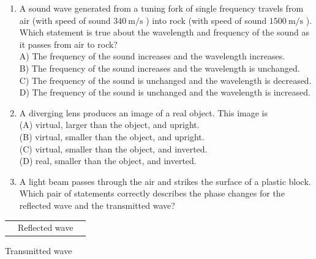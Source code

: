 \begin{enumerate}
\begin{enumerate}
(A) The object is placed at a position outside the radius of curvature for a converging lens.\\
(B) The object is placed at a position outside the radius of curvature for a diverging lens.\\
(C) The object is placed at a position inside the magnitude of the focus for a concave lens.\\
(D) The object is placed at a position between the focus and radius of curvature for a concave mirror.
  \item A sound wave generated from a tuning fork of single frequency travels from air (with speed of sound $340 \mathrm{~m} / \mathrm{s}$ ) into rock (with speed of sound $1500 \mathrm{~m} / \mathrm{s}$ ). Which statement is true about the wavelength and frequency of the sound as it passes from air to rock?\\
A) The frequency of the sound increases and the wavelength increases.\\
B) The frequency of the sound increases and the wavelength is unchanged.\\
C) The frequency of the sound is unchanged and the wavelength is decreased.\\
D) The frequency of the sound is unchanged and the wavelength is increased.
  \item A diverging lens produces an image of a real object. This image is\\
(A) virtual, larger than the object, and upright.\\
(B) virtual, smaller than the object, and upright.\\
(C) virtual, smaller than the object, and inverted.\\
(D) real, smaller than the object, and inverted.
  \item A light beam passes through the air and strikes the surface of a plastic block. Which pair of statements correctly describes the phase changes for the reflected wave and the transmitted wave?
\end{enumerate}

\begin{center}
\begin{tabular}{lll}
 & Reflected wave &  \\
\end{tabular}
\end{center} Transmitted wave


\end{enumerate}
